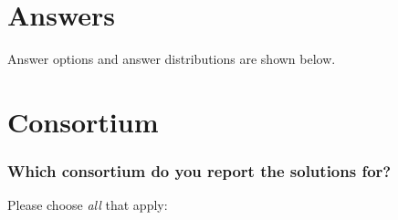 \documentclass[headsepline,titlepage,twoside,12pt,toc=flat,headings=normal]{scrreprt}
\newcommand{\question}[1]{\subsubsection{#1}}
\begin{document}
\iffalse
Each given question $q$ out of the set of multiple choice questions $Q$ is assigned a set of possible answers $A_q$.
Each individual respondent $r$ of the 51 respondents $R$ now selects a subset $A_{q_r} \subseteq A_q$ of the answers for that question.
Base answer counts $c_a$ for each answer $a \in A_q$ are intuitively determined as:

\[ c_a = |\{r \in R: a \in A_{q_r} \}| \].

For example, 2 of the 51 respondents chose \emph{Data Steward} as one of their roles, see  \cref{fig:role} and \cref{tab:results}.
However 
see \cref{fig:role_n}

Normalized counts are determined as:

\[ c{_a}' = \sum_{r \in R: a \in A_{q_r}}{\frac{1}{\mathrm{g}(r)}} \]

where $\mathrm{g}(r)$ is the number of consortia that r belongs to.

\fi


\section{Answers}
Answer options and answer distributions are shown below.

\section{Consortium}

\question{Which consortium do you report the solutions for?}

Please choose \emph{all} that apply:
\end{document}
